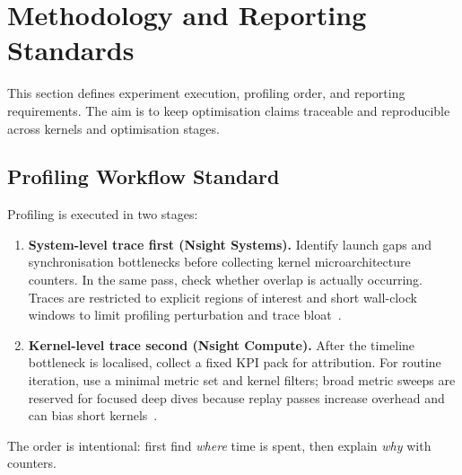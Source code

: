 \section{Methodology and Reporting Standards}
\label{sec:methodology-reporting}

This section defines experiment execution, profiling order, and reporting
requirements. The aim is to keep optimisation claims traceable and reproducible
across kernels and optimisation stages.

\subsection{Profiling Workflow Standard}

Profiling is executed in two stages:
\begin{enumerate}
  \item \textbf{System-level trace first (Nsight Systems).} Identify launch
  gaps and synchronisation bottlenecks before collecting kernel
  microarchitecture counters. In the same pass, check whether overlap is
  actually occurring. Traces are restricted to explicit regions
  of interest and short wall-clock windows to limit profiling perturbation
  and trace bloat~\cite{nvidia-nsight-systems-user-guide,nvidia-nsight-latency}.
  \item \textbf{Kernel-level trace second (Nsight Compute).} After the timeline
  bottleneck is localised, collect a fixed KPI pack for attribution. For routine
  iteration, use a minimal metric set and kernel filters; broad metric sweeps
  are reserved for focused deep dives because replay passes increase overhead
  and can bias short kernels~\cite{nvidia-nsight-compute-profiling-guide}.
\end{enumerate}

The order is intentional: first find \emph{where} time is spent, then explain
\emph{why} with counters.

